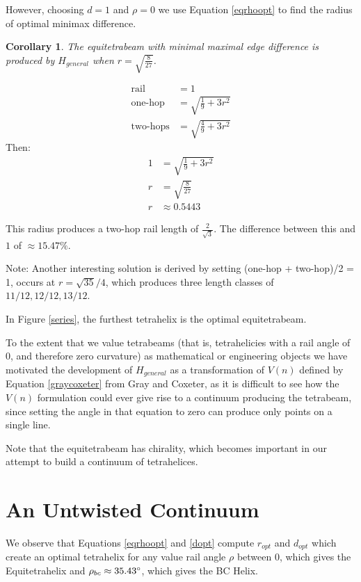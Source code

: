 \documentclass[11pt]{article}
\newtheorem{corollary}{Corollary}
\begin{document}
However, choosing $d = 1$ and $\rho = 0$ we use Equation \eqref{eqrhoopt} to find the radius of 
optimal minimax difference.

\begin{corollary}
  The equitetrabeam with minimal maximal edge difference is produced
  by $H_{general}$ when $ r = \sqrt{\frac{8}{27}} $.
  \end{corollary}

\begin{align*}
  \text{rail} &=  1 \\
  \text{one-hop} &= \sqrt{\frac{1}{9} + 3r^2}\\
\text{two-hops}    &= \sqrt{\frac{4}{9} + 3r^2}
\end{align*}
Then:
\begin{align*}
   1  &=  \sqrt{\frac{1}{9} + 3r^2} \\
   r  &= \sqrt{\frac{8}{27}} \\
   r &\approx 0.5443
\end{align*}

This radius produces a two-hop rail length of
$\frac{2}{\sqrt{3}}$. The difference between this 
and $1$ of $\approx 15.47\% $.

Note: Another interesting solution is derived by setting (one-hop + two-hop)/2 = 1,  occurs at $r = \sqrt{35}/4$,
which produces three length classes of $11/12, 12/12, 13/12$.

In Figure \ref{series}, the furthest tetrahelix is the optimal equitetrabeam.

To the extent that we value tetrabeams (that is, tetrahelicies with a rail angle of $0$,
and therefore zero curvature) as mathematical or engineering objects
we have motivated the development of $H_{general}$ as a transformation of $V(n)$ defined by
Equation \eqref{graycoxeter} from Gray and Coxeter, as it is difficult to see how
the $V(n)$ 
formulation could ever give rise to a continuum producing the tetrabeam,
since setting the angle in that equation to zero can produce only points on a single
line.

Note that the equitetrabeam has chirality, which becomes important in our attempt to build a
continuum of tetrahelices.

\section{An Untwisted Continuum}

We observe that Equations \eqref{eqrhoopt} and \eqref{dopt} compute $r_{opt}$ and $d_{opt}$ which
create an optimal tetrahelix for any value rail angle $\rho$ between $0$, which
gives the Equitetrahelix and
$\rho_{bc} \approx 35.43 \degree$, which gives the BC Helix.
\end{document}

